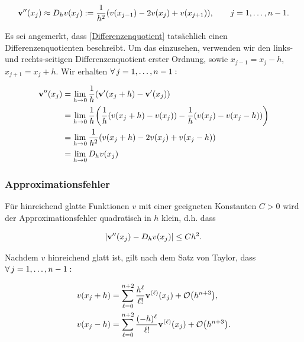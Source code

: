 \begin{align} \label{Differenzenquotient}
  \mathbf{v}^{\prime \prime}(x_j) \approx
  D_h v(x_j) :=
  \frac{1}{h^2} (v(x_{j-1}) - 2 v(x_j) + v(x_{j+1})), \qquad
  j = 1, \ldots, n-1.
\end{align}

Es sei angemerkt, dass \eqref{Differenzenquotient} tatsächlich einen Differenzenquotienten beschreibt. Um das einzusehen, verwenden wir den links- und rechts-seitigen Differenzenquotient erster Ordnung, sowie $x_{j-1} = x_j - h$, $x_{j+1} = x_j + h$. Wir erhalten $\forall \, j = 1, \ldots, n-1:$

\begin{align*}
  \mathbf{v}^{\prime \prime}(x_j)
  & = \lim_{h \to 0}
      \frac{1}{h} {\left ( 
        \mathbf{v}^\prime(x_j + h) - \mathbf{v}^\prime(x_j)
       \right )} \\
  & = \lim_{h \to 0}
      \frac{1}{h} {\left ( 
        \frac{1}{h} {\left ( 
          v(x_j + h) - v(x_j)
         \right )} -
        \frac{1}{h} {\left ( 
          v(x_j) - v(x_j - h)
         \right )}
       \right )} \\
  & = \lim_{h \to 0}
      \frac{1}{h^2} {\left ( 
        v(x_j + h) - 2 v(x_j) + v(x_j - h)
       \right )} \\
  & = \lim_{h \to 0}
      D_h v(x_j)
\end{align*}

\subsubsection{Approximationsfehler}

Für hinreichend glatte Funktionen $v$ mit einer geeigneten Konstanten $C > 0$ wird der Approximationsfehler quadratisch in $h$ klein, d.h. dass

\begin{align} \label{quadratische_Konvergenz}
  {\left | \mathbf{v}^{\prime \prime}(x_j) - D_h v(x_j) \right |} \leq C h^2.
\end{align}

Nachdem $v$ hinreichend glatt ist, gilt nach dem Satz von Taylor, dass $\forall \, j = 1, \ldots, n-1:$

\begin{align*}
  v(x_j + h) & =
  \sum_{\ell = 0}^{n+2}
  \frac{h^\ell}{\ell !}
  \mathbf{v}^{(\ell)}(x_j) +
  \mathcal{O} {\left ( h^{n+3} \right )}, \\
  v(x_j - h) & =
  \sum_{\ell = 0}^{n+2}
  \frac{(-h)^\ell}{\ell !}
  \mathbf{v}^{(\ell)}(x_j) +
  \mathcal{O} {\left ( h^{n+3} \right )}.
\end{align*}

